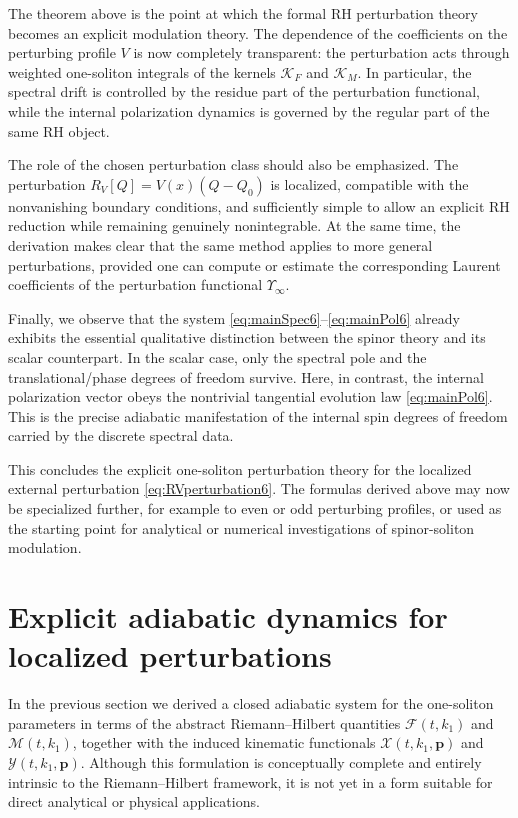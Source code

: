 \documentclass[11pt]{amsart}
\theoremstyle{definition}
\numberwithin{equation}{section}
\begin{document}
The theorem above is the point at which the formal RH perturbation theory becomes an explicit modulation theory. The dependence of the coefficients on the perturbing profile \(V\) is now completely transparent: the perturbation acts through weighted one-soliton integrals of the kernels \(\mathcal K_F\) and \(\mathcal K_M\). In particular, the spectral drift is controlled by the residue part of the perturbation functional, while the internal polarization dynamics is governed by the regular part of the same RH object.

The role of the chosen perturbation class should also be emphasized. The perturbation \(R_V[Q]=V(x)(Q-Q_0)\) is localized, compatible with the nonvanishing boundary conditions, and sufficiently simple to allow an explicit RH reduction while remaining genuinely nonintegrable. At the same time, the derivation makes clear that the same method applies to more general perturbations, provided one can compute or estimate the corresponding Laurent coefficients of the perturbation functional \(\Upsilon_\infty\).

Finally, we observe that the system \eqref{eq:mainSpec6}--\eqref{eq:mainPol6} already exhibits the essential qualitative distinction between the spinor theory and its scalar counterpart. In the scalar case, only the spectral pole and the translational/phase degrees of freedom survive. Here, in contrast, the internal polarization vector obeys the nontrivial tangential evolution law \eqref{eq:mainPol6}. This is the precise adiabatic manifestation of the internal spin degrees of freedom carried by the discrete spectral data.

This concludes the explicit one-soliton perturbation theory for the localized external perturbation \eqref{eq:RVperturbation6}. The formulas derived above may now be specialized further, for example to even or odd perturbing profiles, or used as the starting point for analytical or numerical investigations of spinor-soliton modulation.
\section{Explicit adiabatic dynamics for localized perturbations}
\label{NVBC_spinor7}


In the previous section we derived a closed adiabatic system for the one-soliton parameters in terms of the abstract Riemann--Hilbert quantities $\mathcal F(t,k_1)$ and $\mathcal M(t,k_1)$, together with the induced kinematic functionals $\mathcal X(t,k_1,\mathbf p)$ and $\mathcal Y(t,k_1,\mathbf p)$. Although this formulation is conceptually complete and entirely intrinsic to the Riemann--Hilbert framework, it is not yet in a form suitable for direct analytical or physical applications.
\end{document}

